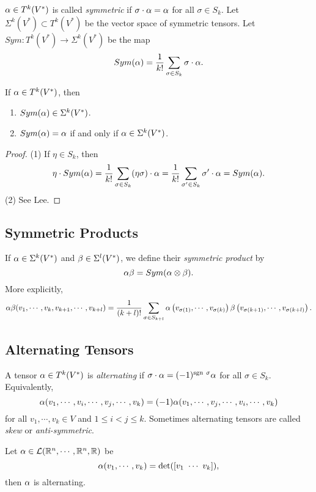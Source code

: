 \begin{definition}
    $\alpha \in T^k(V^*)$ is called \textit{symmetric} if $\sigma \cdot \alpha = \alpha$ for all $\sigma \in S_k$. 
    Let $\Sigma^k(V^*) \subset T^k(V^*)$ be the vector space of symmetric tensors. 
    Let $Sym: T^k(V^*) \to \Sigma^k(V^*)$ be the map 
    $$ Sym(\alpha) = \frac{1}{k!}\sum_{\sigma \in S_k} \sigma \cdot \alpha. $$
\end{definition}
\begin{proposition}
    If $\alpha \in T^k(V^*)$, then 
    \begin{enumerate}
    \item $Sym(\alpha) \in \Sigma^k(V^*)$.
    \item $Sym(\alpha) = \alpha$ if and only if $\alpha \in \Sigma^k(V^*)$.
    \end{enumerate}
\end{proposition}
\begin{proof}
    (1) If $\eta \in S_k$, then $$\eta \cdot Sym(\alpha) = \frac{1}{k!}\sum_{\sigma \in S_k}(\eta \sigma) \cdot \alpha = \frac{1}{k!}\sum_{\sigma' \in S_k} \sigma' \cdot \alpha = Sym(\alpha). $$
    (2) See Lee.
\end{proof}

\subsection{Symmetric Products}
If $\alpha \in \Sigma^k(V^*)$ and $\beta \in \Sigma^l(V^*)$, we define their \textit{symmetric product} by 
$$\alpha \beta = Sym (\alpha \otimes \beta). $$ More explicitly, 
$$\alpha \beta(v_1, \cdots, v_k, v_{k+1}, \cdots, v_{k+l}) = 
\frac{1}{(k+l)!}\sum_{\sigma \in S_{k+l}} \alpha\left(
v_{\sigma(1)}, \cdots, v_{\sigma(k)}
\right) \beta\left(
v_{\sigma(k+1)}, \cdots, v_{\sigma(k+l)}
\right).
$$


\subsection{Alternating Tensors}
A tensor $\alpha \in T^k(V^*)$ is \textit{alternating} if $\sigma \cdot \alpha = (-1)^{\mathrm{sgn~} \sigma} \alpha$ for all $\sigma \in S_k$. Equivalently, 
$$\alpha(v_1, \cdots, v_i, \cdots, v_j, \cdots, v_k) = (-1)\alpha(v_1, \cdots, v_j, \cdots, v_i, \cdots, v_k)$$ for all $v_1, \cdots, v_k \in V$ and $1 \leq i < j \leq k$. Sometimes alternating tensors are called \textit{skew} or \textit{anti-symmetric}.
\begin{example}
    Let $\alpha \in \mathcal{L}(\mathbb{R}^n, \cdots, \mathbb{R}^n, \mathbb{R})$ be 
    $$\alpha(v_1, \cdots, v_k) = \det ([v_1~\cdots~v_k]),$$ then $\alpha$ is alternating. 
\end{example}

